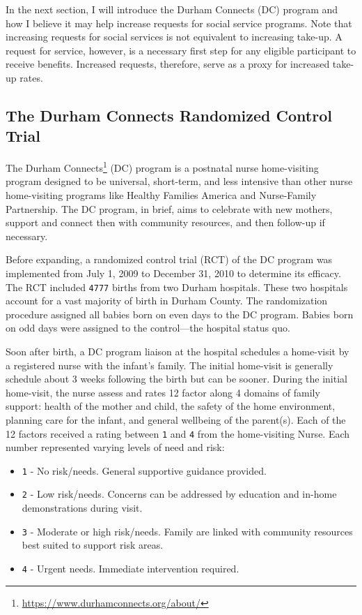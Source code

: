 \documentclass[12pt,letterpaperpaper,]{book}
\providecommand{\tightlist}{%
  \setlength{\itemsep}{0pt}\setlength{\parskip}{0pt}}
\renewcommand{\href}[2]{#2\footnote{\url{#1}}}
\begin{document}
In the next section, I will introduce the Durham Connects (DC) program
and how I believe it may help increase requests for social service
programs. Note that increasing requests for social services is not
equivalent to increasing take-up. A request for service, however, is a
necessary first step for any eligible participant to receive benefits.
Increased requests, therefore, serve as a proxy for increased take-up
rates.

\subsection*{The Durham Connects Randomized Control
Trial}\label{the-durham-connects-randomized-control-trial}

The \href{https://www.durhamconnects.org/about/}{Durham Connects} (DC)
program is a postnatal nurse home-visiting program designed to be
universal, short-term, and less intensive than other nurse home-visiting
programs like Healthy Families America and Nurse-Family Partnership. The
DC program, in brief, aims to celebrate with new mothers, support and
connect then with community resources, and then follow-up if necessary.

Before expanding, a randomized control trial (RCT) of the DC program was
implemented from July 1, 2009 to December 31, 2010 to determine its
efficacy. The RCT included \texttt{4777} births from two Durham
hospitals. These two hospitals account for a vast majority of birth in
Durham County. The randomization procedure assigned all babies born on
even days to the DC program. Babies born on odd days were assigned to
the control---the hospital status quo.

Soon after birth, a DC program liaison at the hospital schedules a
home-visit by a registered nurse with the infant's family. The initial
home-visit is generally schedule about 3 weeks following the birth but
can be sooner. During the initial home-visit, the nurse assess and rates
12 factor along 4 domains of family support: health of the mother and
child, the safety of the home environment, planning care for the infant,
and general wellbeing of the parent(s). Each of the 12 factors received
a rating between \texttt{1} and \texttt{4} from the home-visiting Nurse.
Each number represented varying levels of need and risk:

\begin{itemize}
\tightlist
\item
  \texttt{1} - No risk/needs. General supportive guidance provided.
\item
  \texttt{2} - Low risk/needs. Concerns can be addressed by education
  and in-home demonstrations during visit.
\item
  \texttt{3} - Moderate or high risk/needs. Family are linked with
  community resources best suited to support risk areas.
\item
  \texttt{4} - Urgent needs. Immediate intervention required.
\end{itemize}
\end{document}

